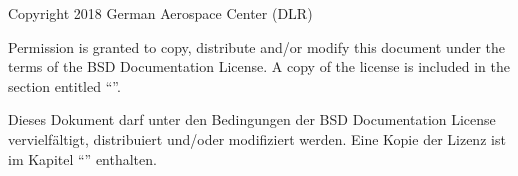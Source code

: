 \newpage

\thispagestyle{empty}

\mbox{}
\vfill

Copyright \textcopyright{} 2018  German Aerospace Center (DLR)

Permission is granted to copy, distribute and/or modify this document under the terms of the BSD Documentation License.  A copy of the license is included in the section entitled ``''.

Dieses Dokument darf unter den Bedingungen der BSD Documentation License vervielf{\"a}ltigt, distribuiert und/oder modifiziert werden. Eine Kopie der Lizenz ist im Kapitel ``'' enthalten.%

\newpage